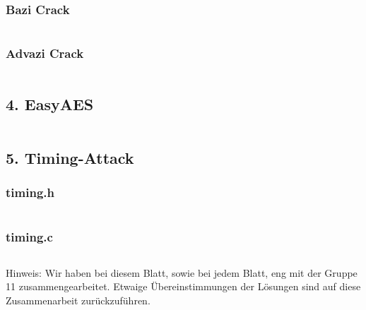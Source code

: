 \documentclass[10pt,a4paper]{article}
\begin{document}
\subsubsection*{Bazi Crack}
\inputminted{python}{crack_bazi.py}

\newpage

\subsubsection*{Advazi Crack}
\inputminted{python}{crack_advazi.py}

\newpage

\subsection{4. EasyAES}
\inputminted{C}{EasyAES/mitm.c}

\subsection{5. Timing-Attack}
\subsubsection*{timing.h}
\inputminted{C}{timingAngriff/timing.h}

\subsubsection*{timing.c}
\inputminted{C}{timingAngriff/timing.c}


Hinweis: Wir haben bei diesem Blatt, sowie bei jedem Blatt, eng mit der Gruppe 11 zusammengearbeitet. Etwaige Übereinstimmungen der Lösungen sind auf diese Zusammenarbeit zurückzuführen.
\end{document}
